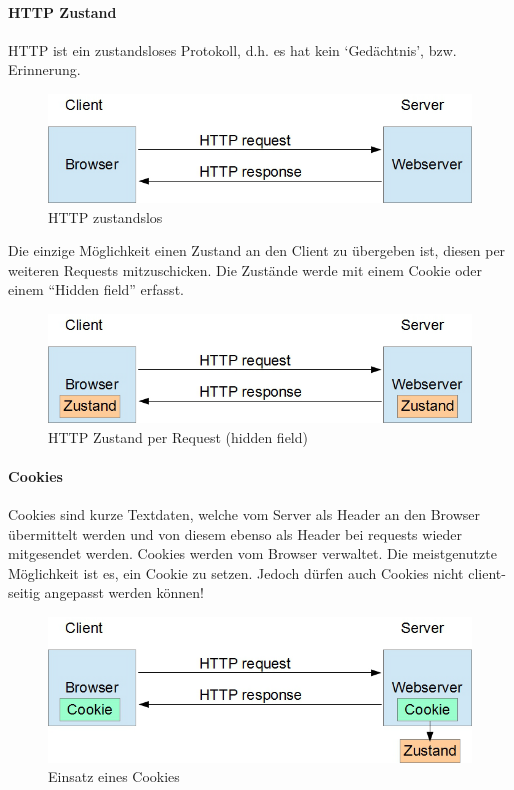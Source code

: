 \documentclass[10pt,a4paper]{article}
\begin{document}
\paragraph*{HTTP Zustand} HTTP ist ein zustandsloses Protokoll, d.h. es hat kein `Gedächtnis', bzw. Erinnerung.
\begin{figure}[H]
    \begin{center}
    \includegraphics[width=12cm]{images/HTTPZustand0.png}
    \caption{HTTP zustandslos}
    \label{HTTPZustandslos}
    \end{center}
\end{figure}
\noindent
Die einzige Möglichkeit einen Zustand an den Client zu übergeben ist, diesen per weiteren Requests mitzuschicken. Die Zustände werde mit einem Cookie oder einem "`Hidden field"' erfasst.
\begin{figure}[H]
    \begin{center}
    \includegraphics[width=12cm]{images/HTTPZustand1.png}
    \caption{HTTP Zustand per Request (hidden field)}
    \label{HTTPZustand}
    \end{center}
\end{figure}

\paragraph*{Cookies}Cookies sind kurze Textdaten, welche vom Server als Header an den Browser übermittelt werden und von diesem ebenso als Header bei requests wieder mitgesendet werden. Cookies werden vom Browser verwaltet. Die meistgenutzte Möglichkeit ist es, ein Cookie zu setzen. Jedoch dürfen auch Cookies nicht client-seitig angepasst werden können!
\begin{figure}[H]
    \begin{center}
    \includegraphics[width=12cm]{images/HTTPCookie.png}
    \caption{Einsatz eines Cookies}
    \label{HTTPCookie}
    \end{center}
\end{figure}
\end{document}
